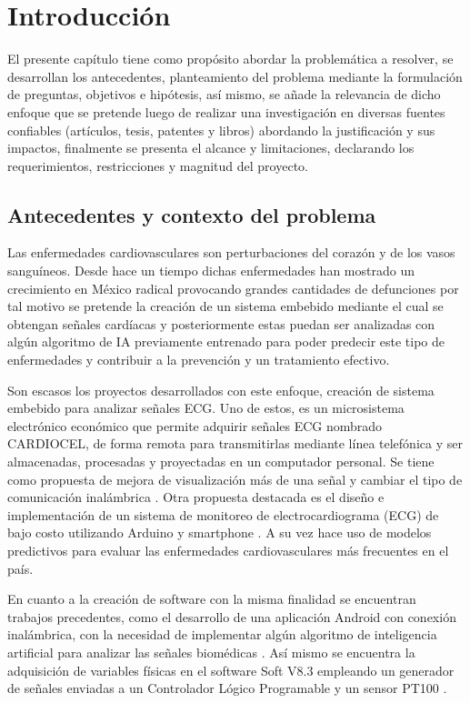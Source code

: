 \chapter{Introducción}
\label{chap:intro}
El presente capítulo tiene como propósito abordar la problemática a resolver, se desarrollan los antecedentes, planteamiento del problema mediante la formulación de preguntas, 
objetivos e hipótesis, así mismo, se añade la relevancia de dicho enfoque que se pretende luego de realizar una investigación en diversas fuentes confiables (artículos, tesis, patentes y libros)
abordando la justificación y sus impactos, finalmente se presenta el alcance y limitaciones, declarando los requerimientos, restricciones y magnitud  del proyecto.

\section{Antecedentes y contexto del problema}
\label{sec:background}

Las enfermedades cardiovasculares son perturbaciones del corazón y de los vasos sanguíneos\citep{bib7}. Desde hace un tiempo dichas enfermedades han mostrado un crecimiento en México radical provocando grandes cantidades de defunciones por tal motivo se pretende la creación de un sistema embebido mediante el cual se obtengan señales cardíacas y posteriormente estas puedan ser analizadas con algún algoritmo de IA previamente entrenado para poder predecir este tipo de enfermedades y contribuir a la prevención y un tratamiento efectivo. 

Son escasos los proyectos desarrollados con este enfoque, creación de sistema embebido para analizar señales ECG. Uno de estos, es un microsistema electrónico económico que permite adquirir señales ECG nombrado CARDIOCEL, de forma remota para transmitirlas mediante línea telefónica y ser almacenadas, procesadas y proyectadas en un computador personal. Se tiene como propuesta de mejora de visualización más de una señal y cambiar el tipo de comunicación inalámbrica \citep{bib2}. Otra propuesta destacada es el diseño e implementación de un sistema de monitoreo de electrocardiograma (ECG) de bajo costo utilizando Arduino y smartphone \citep{bib12}. A su vez \citep{bib7} hace uso de modelos predictivos para evaluar las enfermedades cardiovasculares más frecuentes en el país.

En cuanto a la creación de software con la misma finalidad se encuentran trabajos precedentes, como el desarrollo de una aplicación Android con conexión inalámbrica, con la necesidad de implementar algún algoritmo de inteligencia artificial para analizar las señales biomédicas \citep{bib1}. Así mismo se encuentra la adquisición de variables físicas en el software Soft V8.3 empleando un generador de señales enviadas a un Controlador Lógico Programable y un sensor PT100 \citep{bib8}. 

